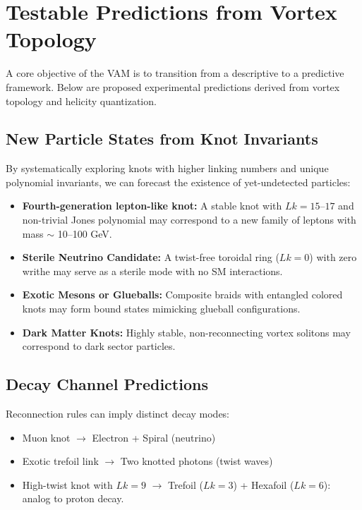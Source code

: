 \section{Testable Predictions from Vortex Topology}

A core objective of the VAM is to transition from a descriptive to a predictive framework. Below are proposed experimental predictions derived from vortex topology and helicity quantization.

\subsection{New Particle States from Knot Invariants}

By systematically exploring knots with higher linking numbers and unique polynomial invariants, we can forecast the existence of yet-undetected particles:

\begin{itemize}
    \item \textbf{Fourth-generation lepton-like knot:} A stable knot with $Lk=15$–$17$ and non-trivial Jones polynomial may correspond to a new family of leptons with mass $\sim$ 10–100 GeV.
    \item \textbf{Sterile Neutrino Candidate:} A twist-free toroidal ring ($Lk=0$) with zero writhe may serve as a sterile mode with no SM interactions.
    \item \textbf{Exotic Mesons or Glueballs:} Composite braids with entangled colored knots may form bound states mimicking glueball configurations.
    \item \textbf{Dark Matter Knots:} Highly stable, non-reconnecting vortex solitons may correspond to dark sector particles.
\end{itemize}

\subsection{Decay Channel Predictions}

Reconnection rules can imply distinct decay modes:
\begin{itemize}
    \item Muon knot $\rightarrow$ Electron + Spiral (neutrino)
    \item Exotic trefoil link $\rightarrow$ Two knotted photons (twist waves)
    \item High-twist knot with $Lk=9$ $\rightarrow$ Trefoil ($Lk=3$) + Hexafoil ($Lk=6$): analog to proton decay.
\end{itemize}


